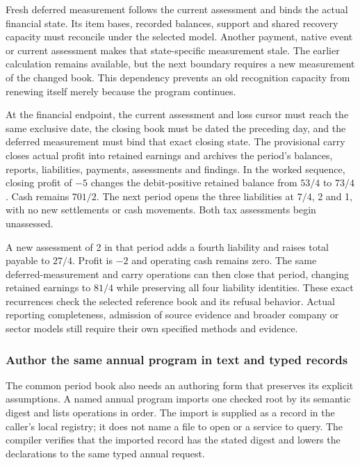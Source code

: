 Fresh deferred measurement follows the current assessment and binds the actual
financial state. Its item bases, recorded balances, support and shared recovery
capacity must reconcile under the selected model. Another payment, native
event or current assessment makes that state-specific measurement stale. The
earlier calculation remains available, but the next boundary requires a new
measurement of the changed book. This dependency prevents an old recognition
capacity from renewing itself merely because the program continues.

At the financial endpoint, the current assessment and loss cursor must reach
the same exclusive date, the closing book must be dated the preceding day,
and the deferred measurement must bind that exact closing state. The
provisional carry closes actual profit into retained earnings and archives the
period's balances, reports, liabilities, payments, assessments and findings.
In the worked sequence, closing profit of $-5$ changes the debit-positive
retained balance from $53/4$ to $73/4$. Cash remains $701/2$. The next period
opens the three liabilities at $7/4$, 2 and 1, with no new settlements or cash
movements. Both tax assessments begin unassessed.

A new assessment of 2 in that period adds a fourth liability and raises total
payable to $27/4$. Profit is $-2$ and operating cash remains zero. The same
deferred-measurement and carry operations can then close that period, changing
retained earnings to $81/4$ while preserving all four liability identities.
These exact recurrences check the selected reference book and its refusal
behavior. Actual reporting completeness, admission of source evidence and
broader company or sector models still require their own specified methods
and evidence.

\subsubsection*{Author the same annual program in text and typed records}
The common period book also needs an authoring form that preserves its explicit
assumptions. A named annual program imports one checked root by its semantic
digest and lists operations in order. The import is supplied as a record in
the caller's local registry; it does not name a file to open or a service to
query. The compiler verifies that the imported record has the stated digest
and lowers the declarations to the same typed annual request.

